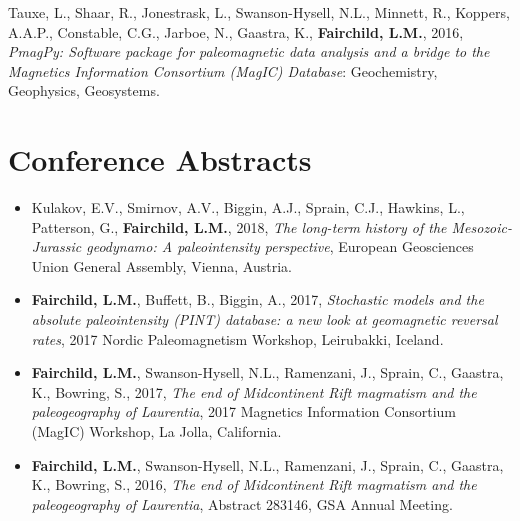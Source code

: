 \documentclass[11pt,a4paper,sans]{moderncv}        %
\begin{document}
\begin{etaremune}
\vspace{3pt}

\item{Tauxe, L., Shaar, R., Jonestrask, L., Swanson-Hysell, N.L., Minnett, R., Koppers, A.A.P., Constable, C.G., Jarboe, N., Gaastra,  K., \textbf{Fairchild, L.M.}, 2016, \textit{PmagPy: Software package for paleomagnetic data analysis and a bridge to the Magnetics Information Consortium (MagIC) Database}: Geochemistry, Geophysics, Geosystems.}

\end{etaremune}

\section{Conference Abstracts}

\begin{itemize}

\vspace{6pt}

\item{Kulakov, E.V., Smirnov, A.V., Biggin, A.J., Sprain, C.J., Hawkins, L., Patterson, G., \textbf{Fairchild, L.M.}, 2018, \textit{The long-term history of the Mesozoic-Jurassic geodynamo: A paleointensity perspective}, European Geosciences Union General Assembly, Vienna, Austria.}

\vspace{3pt}

\item{\textbf{Fairchild, L.M.}, Buffett, B., Biggin, A., 2017, \textit{Stochastic models and the absolute paleointensity (PINT) database: a new look at geomagnetic reversal rates}, 2017 Nordic Paleomagnetism Workshop, Leirubakki, Iceland.}

\vspace{3pt}

\item{\textbf{Fairchild, L.M.}, Swanson-Hysell, N.L., Ramenzani, J., Sprain, C., Gaastra, K., Bowring, S., 2017, \textit{The end of Midcontinent Rift magmatism and the paleogeography of Laurentia}, 2017 Magnetics Information Consortium (MagIC) Workshop, La Jolla, California.}

\vspace{3pt}

\item{\textbf{Fairchild, L.M.}, Swanson-Hysell, N.L., Ramenzani, J., Sprain, C., Gaastra, K., Bowring, S., 2016, \textit{The end of Midcontinent Rift magmatism and the paleogeography of Laurentia}, Abstract 283146, GSA Annual Meeting.}


\end{itemize}
\end{document}
